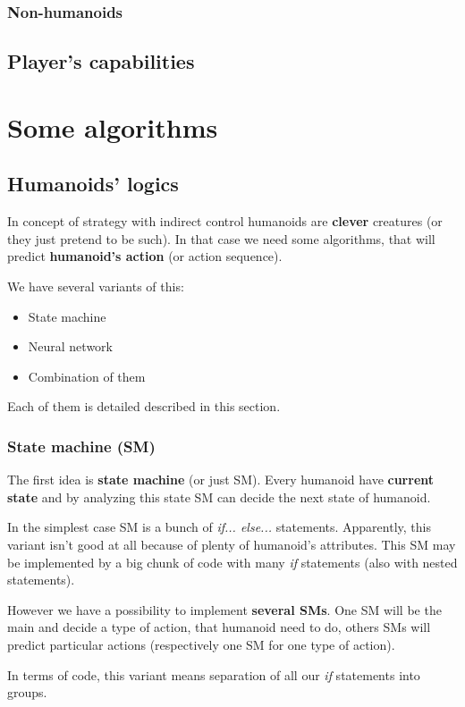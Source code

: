 \documentclass[12pt]{article}
\begin{document}
			\subsubsection{Non-humanoids}
		\subsection{Player's capabilities}

	\section{Some algorithms}
		\subsection{Humanoids' logics}
			In concept of strategy with indirect control humanoids are \textbf{clever} creatures (or they just pretend to be such). In that case we need some algorithms, that will predict \textbf{humanoid's action} (or action sequence).

			We have several variants of this:
				\begin{itemize}
					\item State machine
					\item Neural network
					\item Combination of them
				\end{itemize}

			Each of them is detailed described in this section.

			\subsubsection{State machine (SM)}
				The first idea is \textbf{state machine} (or just SM). Every humanoid have \textbf{current state} and by analyzing this state SM can decide the next state of humanoid.

				In the simplest case SM is a bunch of \textit{if... else...} statements. Apparently, this variant isn't good at all because of plenty of humanoid's attributes. This SM may be implemented by a big chunk of code with many \textit{if} statements (also with nested statements).

				However we have a possibility to implement \textbf{several SMs}. One SM will be the main and decide a type of action, that humanoid need to do, others SMs will predict particular actions (respectively one SM for one type of action).

				In terms of code, this variant means separation of all our \textit{if} statements into groups.
\end{document}

